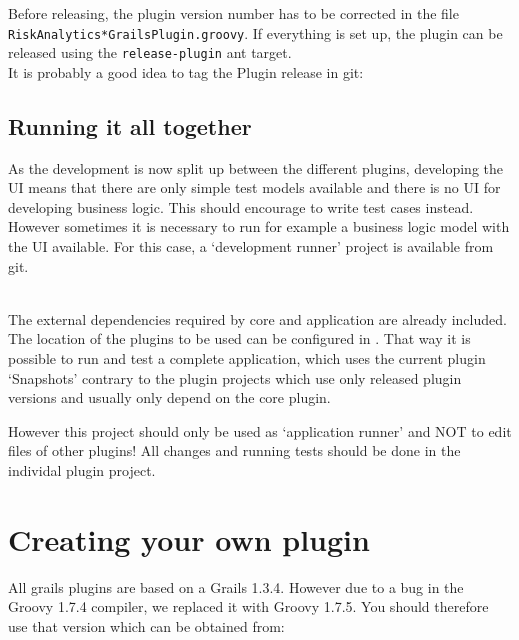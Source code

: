 
Before releasing, the plugin version number has to be corrected in the file \texttt{RiskAnalytics*GrailsPlugin.groovy}.
If everything is set up, the plugin can be released using the \texttt{release-plugin} ant target.\\

It is probably a good idea to tag the Plugin release in git:

\section{Running it all together}

As the development is now split up between the different plugins, developing the UI means
that there are only simple test models available and there is no UI for developing business
logic.
This should encourage to write test cases instead.
However sometimes it is necessary to run for example a business logic model with the UI
available. For this case, a `development runner' project is available from git.

\\

The external dependencies required by core and application are already included.
The location of the \RA{} plugins to be used can be configured in
.
That way it is possible to run and test a complete application, which uses the current
plugin `Snapshots' contrary to the plugin projects which use only released plugin versions
and usually only depend on the core plugin.

However this project should only be used as `application runner' and NOT to edit files of
other plugins!  All changes and running tests should be done in the individal plugin project.


\chapter{Creating your own plugin}
\label{chap:devguide-create-plugins}

All grails plugins are based on a Grails 1.3.4. However due to a bug in the Groovy 1.7.4 compiler, we replaced it with
Groovy 1.7.5. You should therefore use
that version which can be obtained from:

